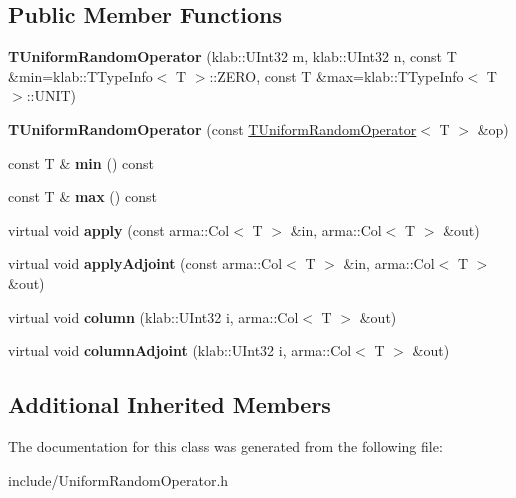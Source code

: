 \subsection*{Public Member Functions}
\begin{DoxyCompactItemize}
\item 
{\bfseries T\+Uniform\+Random\+Operator} (klab\+::\+U\+Int32 m, klab\+::\+U\+Int32 n, const T \&min=klab\+::\+T\+Type\+Info$<$ T $>$\+::Z\+E\+RO, const T \&max=klab\+::\+T\+Type\+Info$<$ T $>$\+::U\+N\+IT)\hypertarget{classkl1p_1_1TUniformRandomOperator_a368f3d7f40a2f7759df51c04720ba63f}{}\label{classkl1p_1_1TUniformRandomOperator_a368f3d7f40a2f7759df51c04720ba63f}

\item 
{\bfseries T\+Uniform\+Random\+Operator} (const \hyperlink{classkl1p_1_1TUniformRandomOperator}{T\+Uniform\+Random\+Operator}$<$ T $>$ \&op)\hypertarget{classkl1p_1_1TUniformRandomOperator_a8a65f21dbf496e277808a3a2d2a36880}{}\label{classkl1p_1_1TUniformRandomOperator_a8a65f21dbf496e277808a3a2d2a36880}

\item 
const T \& {\bfseries min} () const \hypertarget{classkl1p_1_1TUniformRandomOperator_ad7a03e9788bade2ef9c2aa1ad875ece0}{}\label{classkl1p_1_1TUniformRandomOperator_ad7a03e9788bade2ef9c2aa1ad875ece0}

\item 
const T \& {\bfseries max} () const \hypertarget{classkl1p_1_1TUniformRandomOperator_a7a096051f86384becbf976e9cda9b480}{}\label{classkl1p_1_1TUniformRandomOperator_a7a096051f86384becbf976e9cda9b480}

\item 
virtual void {\bfseries apply} (const arma\+::\+Col$<$ T $>$ \&in, arma\+::\+Col$<$ T $>$ \&out)\hypertarget{classkl1p_1_1TUniformRandomOperator_abc7d77c7ccf67d5b09f1b875be3c7e14}{}\label{classkl1p_1_1TUniformRandomOperator_abc7d77c7ccf67d5b09f1b875be3c7e14}

\item 
virtual void {\bfseries apply\+Adjoint} (const arma\+::\+Col$<$ T $>$ \&in, arma\+::\+Col$<$ T $>$ \&out)\hypertarget{classkl1p_1_1TUniformRandomOperator_af5de542f28a6e4fd2f0461746163570c}{}\label{classkl1p_1_1TUniformRandomOperator_af5de542f28a6e4fd2f0461746163570c}

\item 
virtual void {\bfseries column} (klab\+::\+U\+Int32 i, arma\+::\+Col$<$ T $>$ \&out)\hypertarget{classkl1p_1_1TUniformRandomOperator_a29cfb81b0695077d9c34d8a788e9cca8}{}\label{classkl1p_1_1TUniformRandomOperator_a29cfb81b0695077d9c34d8a788e9cca8}

\item 
virtual void {\bfseries column\+Adjoint} (klab\+::\+U\+Int32 i, arma\+::\+Col$<$ T $>$ \&out)\hypertarget{classkl1p_1_1TUniformRandomOperator_ab37db90d4d6ec3545109a5396cb46687}{}\label{classkl1p_1_1TUniformRandomOperator_ab37db90d4d6ec3545109a5396cb46687}

\end{DoxyCompactItemize}
\subsection*{Additional Inherited Members}


The documentation for this class was generated from the following file\+:\begin{DoxyCompactItemize}
\item 
include/Uniform\+Random\+Operator.\+h\end{DoxyCompactItemize}
